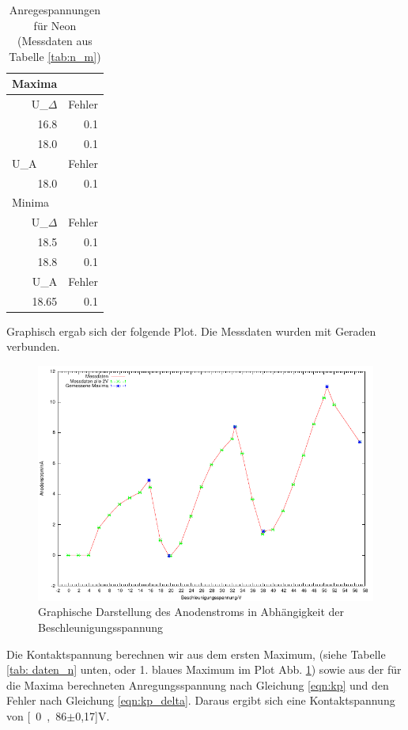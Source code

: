 \documentclass[12pt,a4paper]{article}
\begin{document}
\begin{table}[H]
\caption{Anregespannungen für Neon (Messdaten aus Tabelle \ref{tab:n_m})}
\begin{center}
\begin{tabular}{|r|r|}
\hline
\multicolumn{1}{|l|}{Maxima} & \multicolumn{1}{l|}{} \\ \hline
U\_$\Delta$ & Fehler \\ \hline
16.8 & 0.1 \\ \hline
18.0 & 0.1 \\ \hline
\multicolumn{1}{|l|}{U\_A} & \multicolumn{1}{l|}{Fehler} \\ \hline
18.0 & 0.1 \\ \hline
\multicolumn{1}{|l|}{Minima} & \multicolumn{1}{l|}{} \\ \hline
U\_$\Delta$ & Fehler \\ \hline
18.5 & 0.1 \\ \hline
18.8 & 0.1 \\ \hline
U\_A & Fehler \\ \hline
18.65 & 0.1 \\ \hline
\end{tabular}
\end{center}
\label{tab: auswertung_n} 
\end{table}

Graphisch ergab sich der folgende Plot. Die Messdaten wurden mit Geraden verbunden.

\begin{figure}[H]
	\centering
	\includegraphics[scale= 1.5]{n_m.pdf}
	\caption{Graphische Darstellung des Anodenstroms in Abhängigkeit der Beschleunigungsspannung}
	\label{fig:plot_n}
\end{figure}
Die Kontaktspannung berechnen wir aus dem ersten Maximum, (siehe Tabelle \ref{tab: daten_n} unten, oder 1. blaues Maximum im Plot Abb. \ref{fig:plot_n}) sowie aus der für die Maxima berechneten Anregungsspannung nach Gleichung \ref{eqn:kp} und den Fehler nach Gleichung \ref{eqn:kp_delta}.
Daraus ergibt sich eine Kontaktspannung von \unit[0,86$\pm$0,17]{V}.
\end{document}
